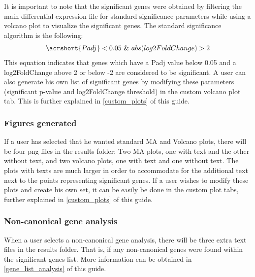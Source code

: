\documentclass[11pt]{article}
\begin{document}
It is important to note that the significant genes were obtained by filtering the main differential expression file for standard significance parameters while using a volcano plot to visualize the significant genes. The standard significance algorithm is the following:
\[\acrshort{Padj}<0.05 \ \&\ abs(log2FoldChange)>2\]
This equation indicates that genes which have a \acrshort{Padj} value below 0.05 and a log2FoldChange above 2 or below -2 are considered to be significant. A user can also generate his own list of significant genes by modifying these parameters (significant p-value and log2FoldChange threshold) in the custom volcano plot tab. This is further explained in \autoref{custom_plots} of this guide.

\subsubsection{Figures generated}
If a user has selected that he wanted standard MA and Volcano plots, there will be four png files in the results folder: Two MA plots, one with text and the other without text, and two volcano plots, one with text and one without text.
The plots with texts are much larger in order to accommodate for the additional text next to the points representing significant genes.
If a user wishes to modify these plots and create his own set, it can be easily be done in the custom plot tabs, further explained in \autoref{custom_plots} of this guide.

\subsubsection{Non-canonical gene analysis}
When a user selects a non-canonical gene analysis, there will be three extra text files in the results folder. That is, if any non-canonical genes were found within the significant genes list. More information can be obtained in \autoref{gene_list_analysis} of this guide.
\end{document}

